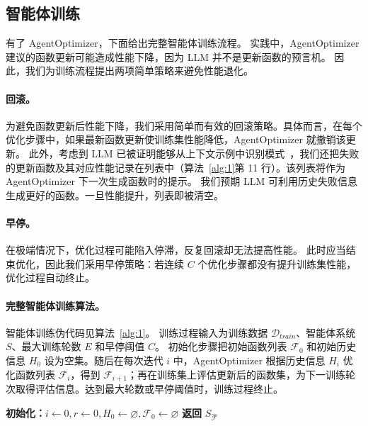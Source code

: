 \documentclass{article}
\begin{document}
\subsection{智能体训练}

有了 AgentOptimizer，下面给出完整智能体训练流程。
实践中，AgentOptimizer 建议的函数更新可能造成性能下降，因为 LLM 并不是更新函数的预言机。
因此，我们为训练流程提出两项简单策略来避免性能退化。

\paragraph{回滚。}
为避免函数更新后性能下降，我们采用简单而有效的回滚策略。具体而言，在每个优化步骤中，如果最新函数更新使训练集性能降低，AgentOptimizer 就撤销该更新。
此外，考虑到 LLM 已被证明能够从上下文示例中识别模式~\cite{wei2022chain}，我们还把失败的更新函数及其对应性能记录在列表中（算法~\ref{alg:1}第 11 行）。该列表将作为 AgentOptimizer 下一次生成函数时的提示。
我们预期 LLM 可利用历史失败信息生成更好的函数。一旦性能提升，列表即被清空。

\paragraph{早停。}
在极端情况下，优化过程可能陷入停滞，反复回滚却无法提高性能。
此时应当结束优化，因此我们采用早停策略：若连续 $C$ 个优化步骤都没有提升训练集性能，优化过程自动终止。

\paragraph{完整智能体训练算法。}
智能体训练伪代码见算法~\ref{alg:1}。
训练过程输入为训练数据 $\mathcal{D}_{train}$、智能体系统 $S$、最大训练轮数 $E$ 和早停阈值 $C$。
初始化步骤把初始函数列表 $\mathcal{F}_{0}$ 和初始历史信息 $H_{0}$ 设为空集。随后在每次迭代 $i$ 中，AgentOptimizer 根据历史信息 $H_i$ 优化函数列表 $\mathcal{F}_i$，得到 $\mathcal{F}_{i+1}$；再在训练集上评估更新后的函数集，为下一训练轮次取得评估信息。达到最大轮数或早停阈值时，训练过程终止。

\begin{algorithm}[!htb]
\small
\SetNoFillComment
\SetAlCapNameFnt{\small}
\SetAlCapFnt{\small}
\renewcommand{\baselinestretch}{0.78}
\caption{智能体训练}
\label{alg:1}
\textbf{初始化：}$i\gets0,r\gets0,H_0\gets\varnothing,\mathcal{F}_0\gets\varnothing$
\textbf{返回} $S_{\hat{\mathcal{F}}}$
\end{algorithm}
\end{document}
